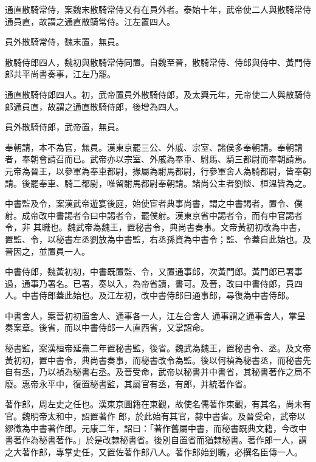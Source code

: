 \begin{pinyinscope}
 通直散騎常侍，案魏末散騎常侍又有在員外者。泰始十年，武帝使二人與散騎常侍通員直，故謂之通直散騎常侍。江左置四人。



 員外散騎常侍，魏末置，無員。



 散騎侍郎四人，魏初與散騎常侍同置。自魏至晉，散騎常侍、侍郎與侍中、黃門侍郎共平尚書奏事，江左乃罷。



 通直散騎侍郎四人。初，武帝置員外散騎侍郎，及太興元年，元帝使二人與散騎侍郎通員直，故謂之通直散騎侍郎，後增為四人。



 員外散騎侍郎，武帝置，無員。



 奉朝請，本不為官，無員。漢東京罷三公、外戚、宗室、諸侯多奉朝請。奉朝請者，奉朝會請召而已。武帝亦以宗室、外戚為奉車、駙馬、騎三都尉而奉朝請焉。元帝為晉王，以參軍為奉車都尉，掾屬為駙馬都尉，行參軍舍人為騎都尉，皆奉朝請。後罷奉車、騎二都尉，唯留駙馬都尉奉朝請。諸尚公主者劉惔、桓溫皆為之。



 中書監及令，案漢武帝遊宴後庭，始使宦者典事尚書，謂之中書謁者，置令、僕射。成帝改中書謁者令曰中謁者令，罷僕射。漢東京省中謁者令，而有中官謁者令，非
 其職也。魏武帝為魏王，置秘書令，典尚書奏事。文帝黃初初改為中書，置監、令，以秘書左丞劉放為中書監，右丞孫資為中書令；監、令蓋自此始也。及晉因之，並置員一人。



 中書侍郎，魏黃初初，中書既置監、令，又置通事郎，次黃門郎。黃門郎已署事過，通事乃署名。已署，奏以入，為帝省讀，書可。及晉，改曰中書侍郎，員四人。中書侍郎蓋此始也。及江左初，改中書侍郎曰通事郎，尋復為中書侍郎。



 中書舍人，案晉初初置舍人、通事各一人，江左合舍人
 通事謂之通事舍人，掌呈奏案章。後省，而以中書侍郎一人直西省，又掌詔命。



 秘書監，案漢桓帝延熹二年置秘書監，後省。魏武為魏王，置秘書令、丞。及文帝黃初初，置中書令，典尚書奏事，而秘書改令為監。後以何禎為秘書丞，而秘書先自有丞，乃以禎為秘書右丞。及晉受命，武帝以秘書并中書省，其秘書著作之局不廢。惠帝永平中，復置秘書監，其屬官有丞，有郎，并統著作省。



 著作郎，周左史之任也。漢東京圖籍在東觀，故使名儒著作東觀，有其名，尚未有官。魏明帝太和中，詔置著作
 郎，於此始有其官，隸中書省。及晉受命，武帝以繆徵為中書著作郎。元康二年，詔曰：「著作舊屬中書，而秘書既典文籍，今改中書著作為秘書著作。」於是改隸秘書省。後別自置省而猶隸秘書。著作郎一人，謂之大著作郎，專掌史任，又置佐著作郎八人。著作郎始到職，必撰名臣傳一人。




\end{pinyinscope}
